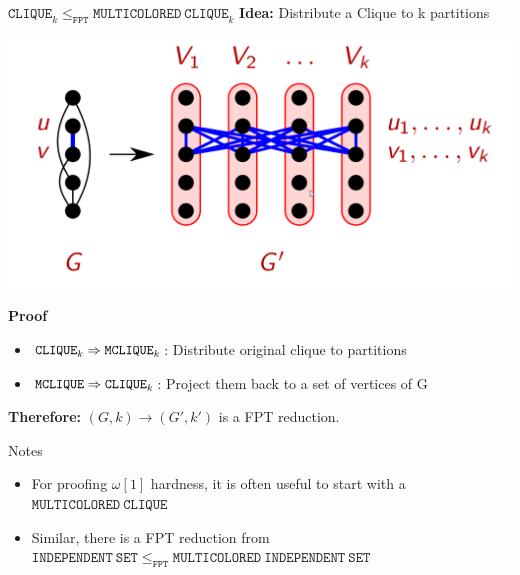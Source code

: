 \begin{frame}[c]{$\mathtt{CLIQUE}_k \leq_{\mathtt{FPT}} \mathtt{MULTICOLORED~CLIQUE}_k$}
\textbf{Idea: } Distribute a Clique to k partitions
    \begin{center}
        \includegraphics[scale=0.17]{img/Unbenannt.png}
    \end{center}
\textbf{Proof} 
\begin{itemize}
    \item $\mathtt{CLIQUE}_k \Rightarrow \mathtt{M\-CLIQUE}_k$: Distribute original clique to partitions
    \item $\mathtt{M\-CLIQUE} \Rightarrow \mathtt{CLIQUE}_k$: Project them back to a set of vertices of G
\end{itemize}
\textbf{Therefore: }$(G,k) \longrightarrow (G',k')$ is a FPT reduction. 
\end{frame}

\begin{frame}[c]{Notes}
\begin{itemize}
\item  For proofing $\omega[1]$ hardness, it is often useful to start with a $\mathtt{MULTICOLORED~CLIQUE}$
\item Similar, there is a FPT reduction from $\mathtt{INDEPENDENT~SET} \leq_{\mathtt{FPT}} \mathtt{MULTICOLORED~INDEPENDENT~SET}$
\end{itemize}
\end{frame}


